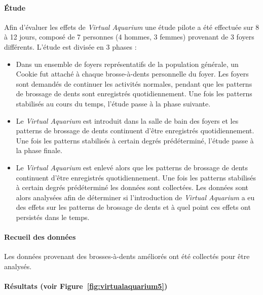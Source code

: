 \documentclass[10pt,a5paper,twoside]{article}
\begin{document}
\paragraph{Étude}\label{uxe9tude}

Afin d'évaluer les effets de \emph{Virtual Aquarium} une étude pilote a
été effectuée sur 8 à 12 jours, composé de 7 personnes (4 hommes, 3
femmes) provenant de 3 foyers différents. L'étude est divisée en 3
phases :

\begin{itemize}
\itemsep1pt\parskip0pt
\item
  Dans un ensemble de foyers représentatifs de la population générale,
  un Cookie fut attaché à chaque brosse-à-dents personnelle du foyer.
  Les foyers sont demandés de continuer les activités normales, pendant
  que les patterns de brossage de dents sont enregistrés
  quotidiennement. Une fois les patterns stabilisés au cours du temps,
  l'étude passe à la phase suivante.
\item
  Le \emph{Virtual Aquarium} est introduit dans la salle de bain des
  foyers et les patterns de brossage de dents continuent d'être
  enregistrés quotidiennement. Une fois les patterns stabilisés à
  certain degrés prédéterminé, l'étude passe à la phase finale.
\item
  Le \emph{Virtual Aquarium} est enlevé alors que les patterns de
  brossage de dents continuent d'être enregistrés quotidiennement. Une
  fois les patterns stabilisés à certain degrés prédéterminé les données
  sont collectées. Les données sont alors analysées afin de déterminer
  si l'introduction de \emph{Virtual Aquarium} a eu des effets sur les
  patterns de brossage de dents et à quel point ces effets ont persistés
  dans le temps.
\end{itemize}

\paragraph{Recueil des données}\label{recueil-des-donnuxe9es}

Les données provenant des brosses-à-dents améliorés ont été collectés
pour être analysés.

\paragraph{Résultats (voir
Figure~\ref{fig:virtualaquarium5})}\label{ruxe9sultats-voir-figure}
\end{document}

